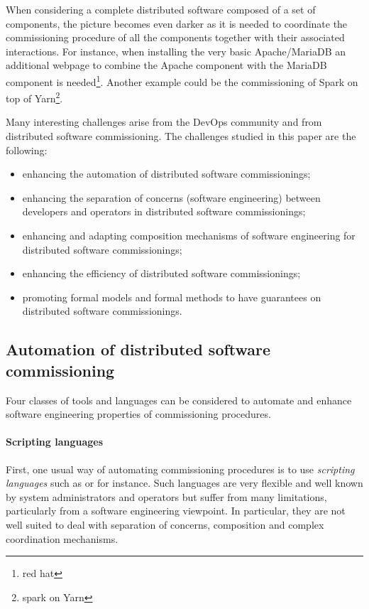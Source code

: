 When considering a complete distributed software composed of a set of
components, the picture becomes even darker as it is needed to
coordinate the commissioning procedure of all the components together
with their associated interactions. For instance, when installing the
very basic Apache/MariaDB an additional webpage to combine the Apache
component with the MariaDB component is needed\footnote{red
  hat}. Another example could be the commissioning of Spark on top of
Yarn\footnote{spark on Yarn}.

Many interesting challenges arise from the DevOps community and from
distributed software commissioning. The challenges studied in this
paper are the following:
\begin{itemize}
\item enhancing the automation of distributed software commissionings;
\item enhancing the separation of concerns (software engineering)
  between developers and operators in distributed software
  commissionings;
\item enhancing and adapting composition mechanisms of software
  engineering for distributed software commissionings;
\item enhancing the efficiency of distributed software commissionings;
\item promoting formal models and formal methods to have guarantees on
  distributed software commissionings.
\end{itemize}

\subsection{Automation of distributed software commissioning}

Four classes of tools and languages can be considered to automate and
enhance software engineering properties of commissioning procedures.

\paragraph{Scripting languages}
First, one usual way of automating commissioning procedures is to use
\emph{scripting languages} such as \shell or \ruby for instance. Such
languages are very flexible and well known by system administrators
and operators but suffer from many limitations, particularly from a
software engineering viewpoint. In particular, they are not well
suited to deal with separation of concerns, composition and complex
coordination mechanisms.

